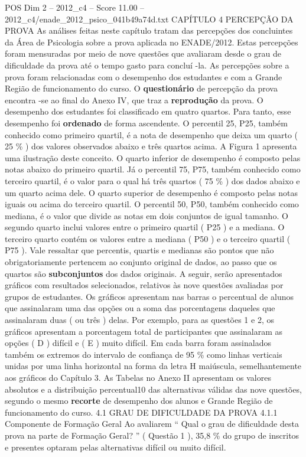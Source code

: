 \begin{textsample}{POS Dim 2 – 2012\_c4 – Score 11.00 – 2012\_c4/enade\_2012\_psico\_041b49a74d.txt}  \label{ex:f2_pos_107}
CAPÍTULO 4 PERCEPÇÃO DA PROVA As análises feitas neste capítulo tratam das percepções dos concluintes da Área de Psicologia sobre a prova aplicada no ENADE/2012.
Estas percepções foram mensuradas por meio de nove questões que avaliaram desde o grau de dificuldade da prova até o tempo gasto para concluí -la.
As percepções sobre a prova foram relacionadas com o desempenho dos estudantes e com a Grande Região de funcionamento do curso.
O \textbf{questionário} de percepção da prova encontra -se ao final do Anexo IV, que traz a \textbf{reprodução} da prova.
O desempenho dos estudantes foi classificado em quatro quartos.
Para tanto, esse desempenho foi \textbf{ordenado} de forma ascendente.
O percentil 25, P25, também conhecido como primeiro quartil, é a nota de desempenho que deixa um quarto ( 25 \% ) dos valores observados abaixo e três quartos acima.
A Figura 1 apresenta uma ilustração deste conceito.
O quarto inferior de desempenho é composto pelas notas abaixo do primeiro quartil.
Já o percentil 75, P75, também conhecido como terceiro quartil, é o valor para o qual há três quartos ( 75 \% ) dos dados abaixo e um quarto acima dele.
O quarto superior de desempenho é composto pelas notas iguais ou acima do terceiro quartil.
O percentil 50, P50, também conhecido como mediana, é o valor que divide as notas em dois conjuntos de igual tamanho.
O segundo quarto inclui valores entre o primeiro quartil ( P25 ) e a mediana.
O terceiro quarto contém os valores entre a mediana ( P50 ) e o terceiro quartil ( P75 ).
Vale ressaltar que percentis, quartis e medianas são pontos que não obrigatoriamente pertencem ao conjunto original de dados, ao passo que os quartos são \textbf{subconjuntos} dos dados originais.
A seguir, serão apresentados gráficos com resultados selecionados, relativos às nove questões avaliadas por grupos de estudantes.
Os gráficos apresentam nas barras o percentual de alunos que assinalaram uma das opções ou a soma das porcentagens daqueles que assinalaram duas ( ou três ) delas.
Por exemplo, para as questões 1 e 2, os gráficos apresentam a porcentagem total de participantes que assinalaram as opções ( D ) difícil e ( E ) muito difícil.
Em cada barra foram assinalados também os extremos do intervalo de confiança de 95 \% como linhas verticais unidas por uma linha horizontal na forma da letra H maiúscula, semelhantemente aos gráficos do Capítulo 3.
As Tabelas no Anexo II apresentam os valores absolutos e a distribuição percentual10 das alternativas válidas das nove questões, segundo o mesmo \textbf{recorte} de desempenho dos alunos e Grande Região de funcionamento do curso. 4.1 GRAU DE DIFICULDADE DA PROVA 4.1.1 Componente de Formação Geral Ao avaliarem “ Qual o grau de dificuldade desta prova na parte de Formação Geral? ” ( Questão 1 ), 35,8 \% do grupo de inscritos e presentes optaram pelas alternativas difícil ou muito difícil.

\end{textsample}

